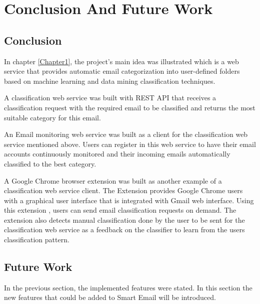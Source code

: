 
\chapter{Conclusion And Future Work} %

\label{Chapter7} %




\section{Conclusion}
In chapter \ref{Chapter1}, the project's main idea was illustrated which
is a web service that provides automatic email categorization into
user-defined folders based on machine learning and data mining
classification techniques.

A classification web service was built with REST API \cite{REST} that receives
a classification request with the required email to be classified and returns
the most suitable category for this email.

An Email monitoring web service was built as a client for the classification
web service mentioned above. Users can register in this web service to have
their email accounts continuously monitored and their incoming emails automatically
classified to the best category.

A Google Chrome browser \cite{CHROME} extension was built as another example of a
classification web service client. The Extension provides Google Chrome users
with a graphical user interface that is integrated with Gmail web interface.
Using this extension , users can send email classification requests on demand.
The extension also detects manual classification done by the user to be sent
for the classification web service as a feedback on the classifier to learn
from the users classification pattern.
\section{Future Work}
In the previous section, the implemented features were stated. In this section
the new features that could be added to Smart Email will be introduced.

